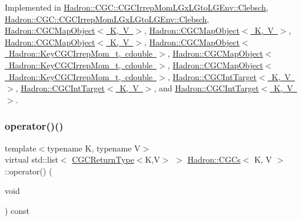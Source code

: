 Implemented in \mbox{\hyperlink{classHadron_1_1CGC_1_1CGCIrrepMomLGxLGtoLGEnv_1_1Clebsch_a27a81332c929b1f421704680e794b796}{Hadron\+::\+C\+G\+C\+::\+C\+G\+C\+Irrep\+Mom\+L\+Gx\+L\+Gto\+L\+G\+Env\+::\+Clebsch}}, \mbox{\hyperlink{classHadron_1_1CGC_1_1CGCIrrepMomLGxLGtoLGEnv_1_1Clebsch_a27a81332c929b1f421704680e794b796}{Hadron\+::\+C\+G\+C\+::\+C\+G\+C\+Irrep\+Mom\+L\+Gx\+L\+Gto\+L\+G\+Env\+::\+Clebsch}}, \mbox{\hyperlink{classHadron_1_1CGCMapObject_aaa4b18e1a2845e16154cd434462c0779}{Hadron\+::\+C\+G\+C\+Map\+Object$<$ K, V $>$}}, \mbox{\hyperlink{classHadron_1_1CGCMapObject_aaa4b18e1a2845e16154cd434462c0779}{Hadron\+::\+C\+G\+C\+Map\+Object$<$ K, V $>$}}, \mbox{\hyperlink{classHadron_1_1CGCMapObject_aaa4b18e1a2845e16154cd434462c0779}{Hadron\+::\+C\+G\+C\+Map\+Object$<$ K, V $>$}}, \mbox{\hyperlink{classHadron_1_1CGCMapObject_aaa4b18e1a2845e16154cd434462c0779}{Hadron\+::\+C\+G\+C\+Map\+Object$<$ Hadron\+::\+Key\+C\+G\+C\+Irrep\+Mom\+\_\+t, cdouble $>$}}, \mbox{\hyperlink{classHadron_1_1CGCMapObject_aaa4b18e1a2845e16154cd434462c0779}{Hadron\+::\+C\+G\+C\+Map\+Object$<$ Hadron\+::\+Key\+C\+G\+C\+Irrep\+Mom\+\_\+t, cdouble $>$}}, \mbox{\hyperlink{classHadron_1_1CGCMapObject_aaa4b18e1a2845e16154cd434462c0779}{Hadron\+::\+C\+G\+C\+Map\+Object$<$ Hadron\+::\+Key\+C\+G\+C\+Irrep\+Mom\+\_\+t, cdouble $>$}}, \mbox{\hyperlink{classHadron_1_1CGCIntTarget_ae6c0ce90fe1f8a2880984df1e2e44c18}{Hadron\+::\+C\+G\+C\+Int\+Target$<$ K, V $>$}}, \mbox{\hyperlink{classHadron_1_1CGCIntTarget_ae6c0ce90fe1f8a2880984df1e2e44c18}{Hadron\+::\+C\+G\+C\+Int\+Target$<$ K, V $>$}}, and \mbox{\hyperlink{classHadron_1_1CGCIntTarget_ae6c0ce90fe1f8a2880984df1e2e44c18}{Hadron\+::\+C\+G\+C\+Int\+Target$<$ K, V $>$}}.

\mbox{\label{classHadron_1_1CGCs_ac709374b31c0319e82028b9d7c23e993}} 
\subsubsection{\texorpdfstring{operator()()}{operator()()}\hspace{0.1cm}{\footnotesize\ttfamily [2/6]}}
{\footnotesize\ttfamily template$<$typename K, typename V$>$ \\
virtual std\+::list$<$ \mbox{\hyperlink{structHadron_1_1CGCReturnType}{C\+G\+C\+Return\+Type}}$<$K,V$>$ $>$ \mbox{\hyperlink{classHadron_1_1CGCs}{Hadron\+::\+C\+G\+Cs}}$<$ K, V $>$\+::operator() (\begin{DoxyParamCaption}\item[{void}]{ }\end{DoxyParamCaption}) const\hspace{0.3cm}{\ttfamily [pure virtual]}}



